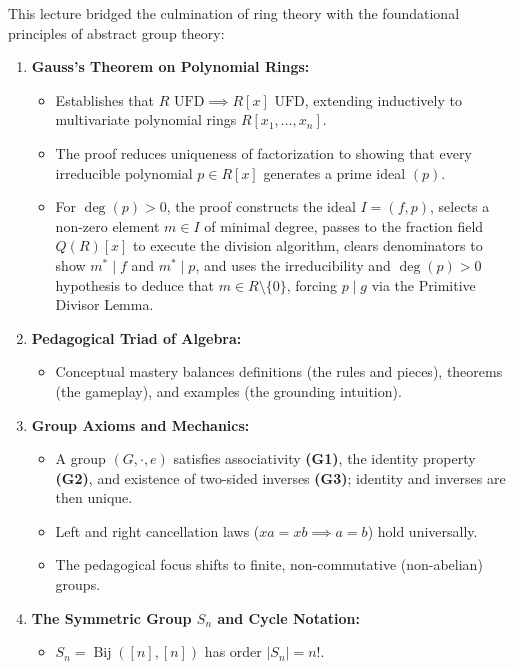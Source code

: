 \begin{overview}
This lecture bridged the culmination of ring theory with the foundational principles of abstract group theory:
\begin{enumerate}[label=\textbf{(\arabic*)}]
    \item \textbf{Gauss's Theorem on Polynomial Rings:}
    \begin{itemize}
        \item Establishes that $R \text{ UFD} \implies R[x] \text{ UFD}$, extending inductively to multivariate polynomial rings $R[x_1, \dots, x_n]$.
        \item The proof reduces uniqueness of factorization to showing that every irreducible polynomial $p \in R[x]$ generates a prime ideal $(p)$.
        \item For $\deg(p) > 0$, the proof constructs the ideal $I = (f, p)$, selects a non-zero element $m \in I$ of minimal degree, passes to the fraction field $Q(R)[x]$ to execute the division algorithm, clears denominators to show $m^* \mid f$ and $m^* \mid p$, and uses the irreducibility and $\deg(p) > 0$ hypothesis to deduce that $m \in R \setminus \{0\}$, forcing $p \mid g$ via the Primitive Divisor Lemma.
    \end{itemize}
    \item \textbf{Pedagogical Triad of Algebra:}
    \begin{itemize}
        \item Conceptual mastery balances definitions (the rules and pieces), theorems (the gameplay), and examples (the grounding intuition).
    \end{itemize}
    \item \textbf{Group Axioms and Mechanics:}
    \begin{itemize}
        \item A group $(G, \cdot, e)$ satisfies associativity \textbf{(G1)}, the identity property \textbf{(G2)}, and existence of two-sided inverses \textbf{(G3)}; identity and inverses are then unique.
        \item Left and right cancellation laws ($xa = xb \implies a = b$) hold universally.
        \item The pedagogical focus shifts to finite, non-commutative (non-abelian) groups.
    \end{itemize}
    \item \textbf{The Symmetric Group $S_n$ and Cycle Notation:}
    \begin{itemize}
        \item $S_n = \operatorname{Bij}([n], [n])$ has order $|S_n| = n!$.

\end{itemize}
\end{enumerate}
\end{overview}
